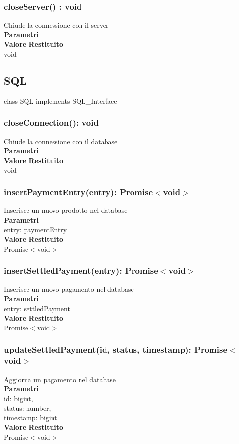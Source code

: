 \documentclass[a4paper, 12pt]{article}
\begin{document}
\subsubsection{closeServer() : void}
Chiude la connessione con il server\\
\textbf{Parametri}\\
\textbf{Valore Restituito}\\
void

\subsection{SQL}
class SQL implements SQL\_Interface
\subsubsection{closeConnection(): void}
Chiude la connessione con il database\\
\textbf{Parametri}\\
\textbf{Valore Restituito}\\
void
\subsubsection{insertPaymentEntry(entry): Promise$<$void$>$}
Inserisce un nuovo prodotto nel database\\
\textbf{Parametri}\\
entry: paymentEntry\\
\textbf{Valore Restituito}\\
Promise$<$void$>$
\subsubsection{insertSettledPayment(entry): Promise$<$void$>$}
Inserisce un nuovo pagamento nel database\\
\textbf{Parametri}\\
entry: settledPayment\\
\textbf{Valore Restituito}\\
Promise$<$void$>$
\subsubsection{updateSettledPayment(id, status, timestamp): Promise$<$void$>$}
Aggiorna un pagamento nel database\\
\textbf{Parametri}\\
id: bigint,\\ 
status: number,\\
timestamp: bigint\\
\textbf{Valore Restituito}\\
Promise$<$void$>$
\end{document}
